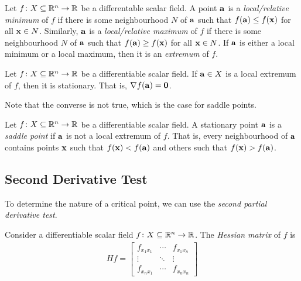 \documentclass{article}
\begin{document}
\begin{definition}[Extrema]
  Let $f \colon X \subseteq \mathbb{R}^n \to \mathbb{R}$ be a differentable scalar field.
  A point $\mathbf{a}$ is a \emph{local/relative minimum} of $f$ if there is some neighbourhood $N$ of $\mathbf{a}$ such that $f(\mathbf{a}) \leq f(\mathbf{x})$ for all $\mathbf{x} \in N$.
  Similarly, $\mathbf{a}$ is a \emph{local/relative maximum} of $f$ if there is some neighbourhood $N$ of $\mathbf{a}$ such that $f(\mathbf{a}) \geq f(\mathbf{x})$ for all $\mathbf{x} \in N$.
  If $\mathbf{a}$ is either a local minimum or a local maximum, then it is an \emph{extremum} of $f$.
\end{definition}

\begin{theorem}
  Let $f \colon X \subseteq \mathbb{R}^n \to \mathbb{R}$ be a differentiable scalar field.
  If $\mathbf{a} \in X$ is a local extremum of $f$, then it is stationary.
  That is, $\nabla f(\mathbf{a}) = \mathbf{0}$.
\end{theorem}
Note that the converse is not true, which is the case for saddle points.

\begin{definition}
  Let $f \colon X \subseteq \mathbb{R}^n \to \mathbb{R}$ be a differentiable scalar field.
  A stationary point $\mathbf{a}$ is a \emph{saddle point} if $\mathbf{a}$ is not a local extremum of $f$.
  That is, every neighbourhood of $\mathbf{a}$ contains points $\mathbf{x}$ such that $f(\mathbf{x}) < f(\mathbf{a})$ and others such that $f(\mathbf{x}) > f(\mathbf{a})$.
\end{definition}

\subsection{Second Derivative Test}

To determine the nature of a critical point, we can use the \emph{second partial derivative test}.

\begin{definition}
  Consider a differentiable scalar field $f \colon X \subseteq \mathbb{R}^n \to \mathbb{R}$.
  The \emph{Hessian matrix} of $f$ is
  \begin{align}
    Hf = \begin{bmatrix}
           f_{x_1 x_1} & \cdots & f_{x_1 x_n}
           \\
           \vdots      & \ddots & \vdots
           \\
           f_{x_n x_1} & \cdots & f_{x_n x_n}
         \end{bmatrix}
  \end{align}
\end{definition}
\end{document}

